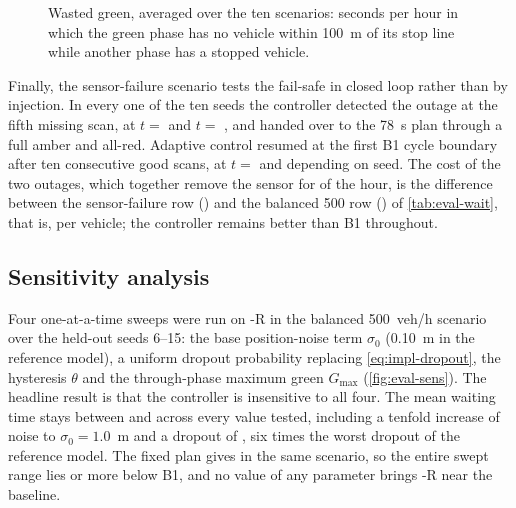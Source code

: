 \begin{figure}[htbp]
\centering
{}
\caption{Wasted green, averaged over the ten scenarios: seconds per hour in which the green phase has no vehicle within 100~m of its stop line while another phase has a stopped vehicle.}
\label{fig:eval-wasted}
\end{figure}

Finally, the sensor-failure scenario tests the fail-safe in closed loop rather than by injection. In every
one of the ten seeds the controller detected the outage at the fifth missing scan, at $t =$  and
$t =$ , and handed over to the 78~s plan through a full amber and all-red. Adaptive control
resumed at the first B1 cycle boundary after ten consecutive good scans, at $t =$  and
 depending on seed. The cost of the two outages, which together remove the sensor for
 of the hour, is the difference between the sensor-failure row () and the balanced 500
row () of \cref{tab:eval-wait}, that is,  per vehicle; the controller remains
 better than B1 throughout.

\subsection{Sensitivity analysis}\label{sec:eval-sensitivity}

Four one-at-a-time sweeps were run on \prism{}-R in the balanced 500~veh/h scenario over the held-out seeds
6--15: the base position-noise term $\sigma_0$ (0.10~m in the reference model), a uniform dropout probability
replacing \cref{eq:impl-dropout}, the hysteresis $\theta$ and the through-phase maximum green $G_{\max}$
(\cref{fig:eval-sens}). The headline result is that the controller is insensitive to all four. The mean
waiting time stays between  and  across every value tested, including a tenfold
increase of noise to $\sigma_0 = 1.0$~m and a dropout of , six times the worst dropout of the
reference model. The fixed plan gives  in the same scenario, so the entire swept range lies
 or more below B1, and no value of any parameter brings \prism{}-R near the baseline.

